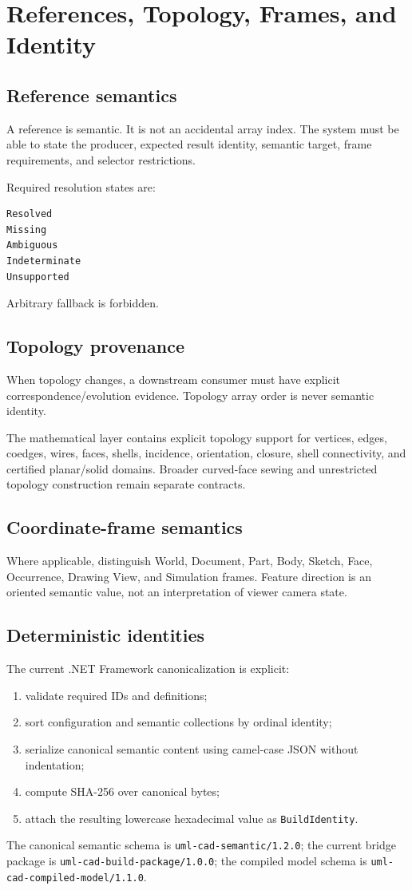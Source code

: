 \documentclass[11pt,a4paper]{report}
\begin{document}
\chapter{References, Topology, Frames, and Identity}

\section{Reference semantics}
A reference is semantic. It is not an accidental array index. The system must be able to state the producer, expected result identity, semantic target, frame requirements, and selector restrictions.

Required resolution states are:
\begin{lstlisting}
Resolved
Missing
Ambiguous
Indeterminate
Unsupported
\end{lstlisting}
Arbitrary fallback is forbidden.

\section{Topology provenance}
When topology changes, a downstream consumer must have explicit correspondence/evolution evidence. Topology array order is never semantic identity.

The mathematical layer contains explicit topology support for vertices, edges, coedges, wires, faces, shells, incidence, orientation, closure, shell connectivity, and certified planar/solid domains. Broader curved-face sewing and unrestricted topology construction remain separate contracts.

\section{Coordinate-frame semantics}
Where applicable, distinguish World, Document, Part, Body, Sketch, Face, Occurrence, Drawing View, and Simulation frames. Feature direction is an oriented semantic value, not an interpretation of viewer camera state.

\section{Deterministic identities}
The current .NET Framework canonicalization is explicit:
\begin{enumerate}
\item validate required IDs and definitions;
\item sort configuration and semantic collections by ordinal identity;
\item serialize canonical semantic content using camel-case JSON without indentation;
\item compute SHA-256 over canonical bytes;
\item attach the resulting lowercase hexadecimal value as \texttt{BuildIdentity}.
\end{enumerate}
The canonical semantic schema is \texttt{uml-cad-semantic/1.2.0}; the current bridge package is \texttt{uml-cad-build-package/1.0.0}; the compiled model schema is \texttt{uml-cad-compiled-model/1.1.0}.
\end{document}
